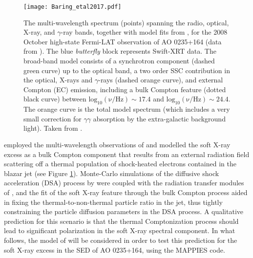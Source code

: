 \documentclass[twocolumn, tighten, twocolappendix]{aastex63}
\begin{document}
\begin{figure}[ht!]
\texttt{[image: Baring\_etal2017.pdf]}
\caption{The multi-wavelength spectrum (points) spanning the radio, optical, X-ray, and $\gamma$-ray bands, together with model fits from \cite{Baring_etal2017}, for the 2008 October high-state Fermi-LAT observation of AO 0235+164 (data from \cite{Ackermann_etal2012}). The blue \textit{butterfly} block represents Swift-XRT data. The broad-band model consists of a synchrotron component (dashed green curve) up to the optical band, a two order SSC contribution in the optical, X-rays and $\gamma$-rays (dashed orange curve), and external Compton (EC) emission, including a bulk Compton feature (dotted black curve) between $\mathrm{log_{10}(\nu/ Hz)}\sim 17.4$ and $\mathrm{log_{10}(\nu/ Hz)}\sim 24.4$. The orange curve is the total model spectrum (which includes a very small correction for $\gamma \gamma$ absorption by the extra-galactic background light). Taken from \cite{Baring_etal2017}. \label{fig:Baring_etal2017}}
\end{figure}
\cite{Baring_etal2017} employed the multi-wavelength observations of \cite{Ackermann_etal2012} and modelled the soft X-ray excess as a bulk Compton component that results from an external radiation field scattering off a thermal population of shock-heated electrons contained in the blazar jet (see Figure \ref{fig:Baring_etal2017}). Monte-Carlo simulations of the diffusive shock acceleration (DSA) process by \cite{Summerlin_Baring_2012} were coupled with the radiation transfer modules of \cite{Bottcher_etal2013}, and the fit of the soft X-ray feature through the bulk Compton process aided in fixing the thermal-to-non-thermal particle ratio in the jet, thus tightly constraining the particle diffusion parameters in the DSA process. A qualitative prediction for this scenario is that the thermal Comptonization process should lead to significant polarization in the soft X-ray spectral component. In what follows, the model of \cite{Baring_etal2017} will be considered in order to test this prediction for the soft X-ray excess in the SED of AO 0235+164, using the MAPPIES code.
\end{document}

